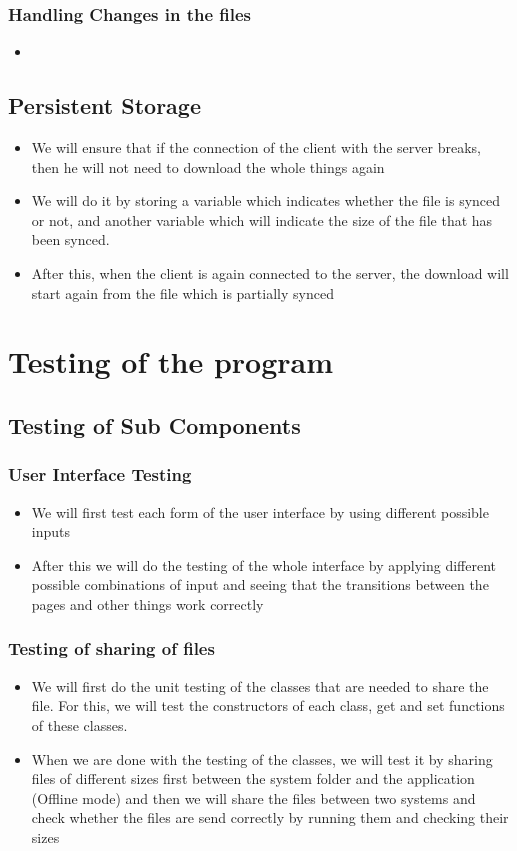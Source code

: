 \documentclass{article}
\begin{document}
			\subsubsection{Handling Changes in the files}
				\begin{itemize}
					\item 
				\end{itemize}
		\subsection{Persistent Storage}
			\begin{itemize}
					\item We will ensure that if the connection of the client with the server breaks, then he will not need to download the whole things again
				\item We will do it by storing a variable which indicates whether the file is synced or not, and another variable which will indicate the size of the file that has been synced. 
				\item After this, when the client is again connected to the server, the download will start again from the file which is partially synced
			\end{itemize}
	\section{Testing of the program}
		\subsection{Testing of Sub Components}
			\subsubsection{User Interface Testing}
				\begin{itemize}
					\item We will first test each form of the user interface by using different possible inputs
					\item After this we will do the testing of the whole interface by applying different possible combinations of input and seeing that the transitions between the pages and other things work correctly
				\end{itemize}
			\subsubsection{Testing of sharing of files}
				\begin{itemize}
					\item We will first do the unit testing of the classes that are needed to share the file. For this, we will test the constructors of each class, get and set functions of these classes.
					\item When we are done with the testing of the classes, we will test it by sharing files of different sizes first between the system folder and the application (Offline mode) and then we will share the files between two systems and check whether the files are send correctly by running them and checking their sizes
				\end{itemize}
\end{document}

